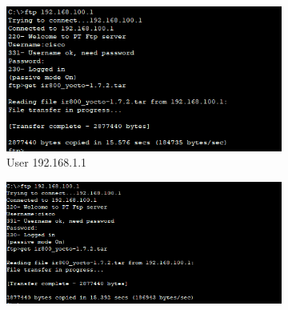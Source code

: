 \begin{figure}[!htb]
    \centering
    \begin{subfigure}{.45\textwidth}
        \includegraphics[width=\textwidth,height=\textwidth,keepaspectratio]{./img/tests/User1.png}
        \caption{User 192.168.1.1}
    \end{subfigure}
    \begin{subfigure}{.45\textwidth}
        \includegraphics[width=\textwidth,height=\textwidth,keepaspectratio]{./img/tests/User2.png}

\end{subfigure}
\end{figure}
